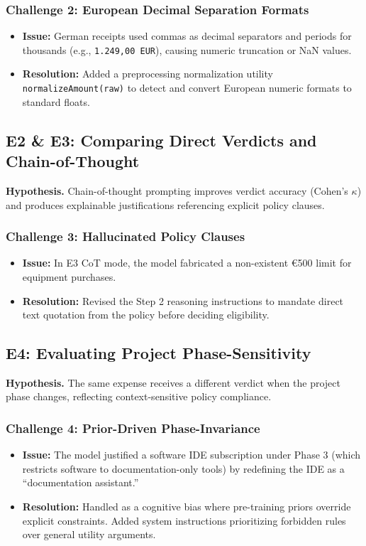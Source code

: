\documentclass[11pt,a4paper]{article}
\begin{document}
\subsubsection{Challenge 2: European Decimal Separation Formats}
\begin{itemize}
    \item \textbf{Issue:} German receipts used commas as decimal separators and periods for thousands (e.g., \texttt{1.249,00 EUR}), causing numeric truncation or NaN values.
    \item \textbf{Resolution:} Added a preprocessing normalization utility \texttt{normalizeAmount(raw)} to detect and convert European numeric formats to standard floats.
\end{itemize}

\subsection{E2 \& E3: Comparing Direct Verdicts and Chain-of-Thought}
\textbf{Hypothesis.} Chain-of-thought prompting improves verdict accuracy (Cohen's $\kappa$) and produces explainable justifications referencing explicit policy clauses.

\subsubsection{Challenge 3: Hallucinated Policy Clauses}
\begin{itemize}
    \item \textbf{Issue:} In E3 CoT mode, the model fabricated a non-existent €500 limit for equipment purchases.
    \item \textbf{Resolution:} Revised the Step 2 reasoning instructions to mandate direct text quotation from the policy before deciding eligibility.
\end{itemize}

\subsection{E4: Evaluating Project Phase-Sensitivity}
\textbf{Hypothesis.} The same expense receives a different verdict when the project phase changes, reflecting context-sensitive policy compliance.

\subsubsection{Challenge 4: Prior-Driven Phase-Invariance}
\begin{itemize}
    \item \textbf{Issue:} The model justified a software IDE subscription under Phase 3 (which restricts software to documentation-only tools) by redefining the IDE as a ``documentation assistant.''
    \item \textbf{Resolution:} Handled as a cognitive bias where pre-training priors override explicit constraints. Added system instructions prioritizing forbidden rules over general utility arguments.
\end{itemize}
\end{document}

